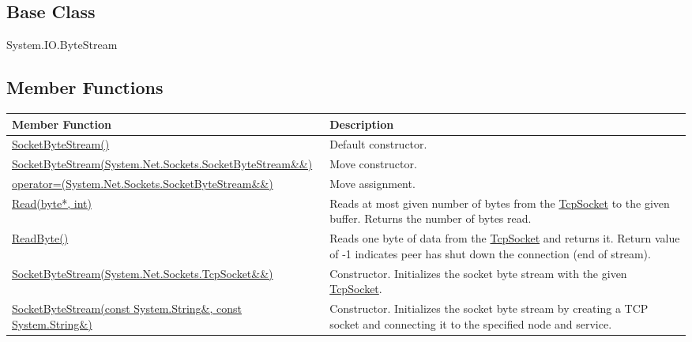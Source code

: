 \documentclass[a4paper,oneside,11.000000pt]{book}
\begin{document}
\subsection*{Base Class}System.IO.ByteStream\subsection{Member Functions}
\begin{flushleft}
\begin{supertabular}[l]{!{\raggedright}p{7.575cm}!{\raggedright}p{7.575cm}}
\textbf{Member Function}
& \textbf{Description}
\\
\hline
\hyperlink{System.Net.Sockets.SocketByteStream.constructor.P.System.Net.Sockets.SocketByteStream}{SocketByteStream()}
& Default constructor.

\\
\hyperlink{System.Net.Sockets.SocketByteStream.constructor.P.System.Net.Sockets.SocketByteStream.RR.System.Net.Sockets.SocketByteStream}{SocketByteStream(System.\-Net.\-Sockets.\-SocketByteStream\&\-\&\-)}
& Move constructor.

\\
\hyperlink{System.Net.Sockets.SocketByteStream.operator.assign.P.System.Net.Sockets.SocketByteStream.RR.System.Net.Sockets.SocketByteStream}{operator=(System.\-Net.\-Sockets.\-SocketByteStream\&\-\&\-)}
& Move assignment.

\\
\hyperlink{System.Net.Sockets.SocketByteStream.Read.P.System.Net.Sockets.SocketByteStream.P.byte.int}{Read(byte*, int)}
& Reads at most given number of bytes from the \hyperlink{System.Net.Sockets.TcpSocket}{TcpSocket} to the given buffer.
Returns the number of bytes read.

\\
\hyperlink{System.Net.Sockets.SocketByteStream.ReadByte.P.System.Net.Sockets.SocketByteStream}{ReadByte()}
& Reads one byte of data from the \hyperlink{System.Net.Sockets.TcpSocket}{TcpSocket} and returns it.
Return value of -1 indicates peer has shut down the connection (end of stream).

\\
\hyperlink{System.Net.Sockets.SocketByteStream.constructor.P.System.Net.Sockets.SocketByteStream.RR.System.Net.Sockets.TcpSocket}{SocketByteStream(System.\-Net.\-Sockets.\-TcpSocket\&\-\&\-)}
& Constructor. Initializes the socket byte stream with the given \hyperlink{System.Net.Sockets.TcpSocket}{TcpSocket}.

\\
\hyperlink{System.Net.Sockets.SocketByteStream.constructor.P.System.Net.Sockets.SocketByteStream.C.R.System.String.C.R.System.String}{SocketByteStream(const System.\-String\&\-, const System.\-String\&\-)}
& Constructor. Initializes the socket byte stream by creating a TCP socket and connecting it to the specified node and service.


\end{supertabular}
\end{flushleft}
\end{document}
